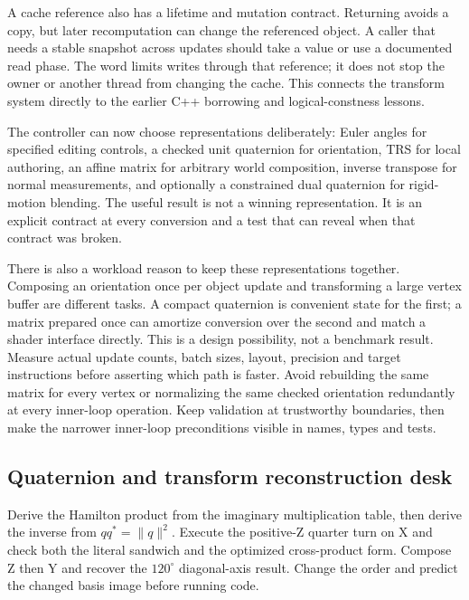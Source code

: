 A cache reference also has a lifetime and mutation contract. Returning  avoids a copy, but later recomputation can change the referenced object. A caller that needs a stable snapshot across updates should take a value or use a documented read phase. The word  limits writes through that reference; it does not stop the owner or another thread from changing the cache. This connects the transform system directly to the earlier C++ borrowing and logical-constness lessons.

The controller can now choose representations deliberately: Euler angles for specified editing controls, a checked unit quaternion for orientation, TRS for local authoring, an affine matrix for arbitrary world composition, inverse transpose for normal measurements, and optionally a constrained dual quaternion for rigid-motion blending. The useful result is not a winning representation. It is an explicit contract at every conversion and a test that can reveal when that contract was broken.

There is also a workload reason to keep these representations together. Composing an orientation once per object update and transforming a large vertex buffer are different tasks. A compact quaternion is convenient state for the first; a matrix prepared once can amortize conversion over the second and match a shader interface directly. This is a design possibility, not a benchmark result. Measure actual update counts, batch sizes, layout, precision and target instructions before asserting which path is faster. Avoid rebuilding the same matrix for every vertex or normalizing the same checked orientation redundantly at every inner-loop operation. Keep validation at trustworthy boundaries, then make the narrower inner-loop preconditions visible in names, types and tests.

\subsection{Quaternion and transform reconstruction desk}\label{01-foundations-i-ch019-quaternion-and-transform-reconstruction-desk}

\hypertarget{01-foundations-i-ch019-quaternion-and-transform-reconstruction-desk}{}

Derive the Hamilton product from the imaginary multiplication table, then derive the inverse from \(qq^*=\|q\|^2\). Execute the positive-Z quarter turn on X and check both the literal sandwich and the optimized cross-product form. Compose Z then Y and recover the \(120^\circ\) diagonal-axis result. Change the order and predict the changed basis image before running code.

